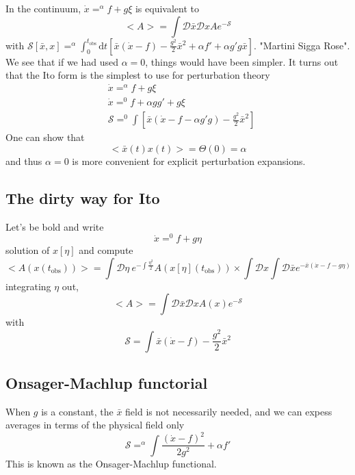 \documentclass[a4paper]{book}
\theoremstyle{definition}
\theoremstyle{remark}
\begin{document}
In the continuum, $\dot{x} =^\alpha f+g\xi$ is equivalent to 
\begin{equation}
    <A> = \int \mathcal{D}\bar{x}\mathcal{D}x A e^{-\mathcal{S}}
\end{equation}
with $\mathcal{S}[\bar{x}, x] =^\alpha \int_{0}^{t_\text{obs}} \text{d}t [\bar{x}(\dot{x} - f) - \frac{g^2}{2}\bar{x}^2 + \alpha f' + \alpha g'g\bar{x}]$. "Martini Sigga Rose". We see that if we had used $\alpha = 0$, things would have been simpler. It turns out that the Ito form is the simplest to use for perturbation theory 
\begin{equation}
    \begin{aligned}
        &\dot{x} =^\alpha f + g\xi \\ 
        &\dot{x} =^0 f + \alpha gg' + g\xi \\
        &\mathcal{S} =^0 \int [\bar{x}(\dot{x} - f - \alpha g'g) - \frac{g^2}{2}\bar{x}^2]
    \end{aligned}
\end{equation}
One can show that 
\begin{equation}
    <\bar{x}(t)x(t)> = \Theta(0) = \alpha
\end{equation}
and thus $\alpha = 0$ is more convenient for explicit perturbation expansions. 

\subsection{The dirty way for Ito}

Let's be bold and write 
\begin{equation}
    \dot{x} =^0 f + g\eta 
\end{equation}
solution of $x[\eta]$ and compute 
\begin{equation}
    <A(x(t_{\text{obs}}))> = \int \mathcal{D}\eta ~e^{-\int \frac{\eta^2}{2}} A(x[\eta](t_{\text{obs}})) \times \int \mathcal{D}x \int \mathcal{D}\bar{x} e^{-\bar{x}(\dot{x} - f- g\eta)}
\end{equation}
integrating $\eta$ out, 
\begin{equation}
    <A> = \int \mathcal{D}\bar{x}\mathcal{D}x A(x) e^{-\mathcal{S}}
\end{equation}
with 
\begin{equation}
    \mathcal{S} = \int \bar{x}(\dot{x} - f) - \frac{g^2}{2}\bar{x}^2
\end{equation}

\subsection{Onsager-Machlup functorial}
When $g$ is a constant, the $\bar{x}$ field is not necessarily needed, and we can expess averages in terms of the physical field only 
\begin{equation}
    \mathcal{S} =^\alpha \int \frac{(\dot{x} - f)^2}{2g^2} + \alpha f'
\end{equation}
This is known as the Onsager-Machlup functional. 
\end{document}
